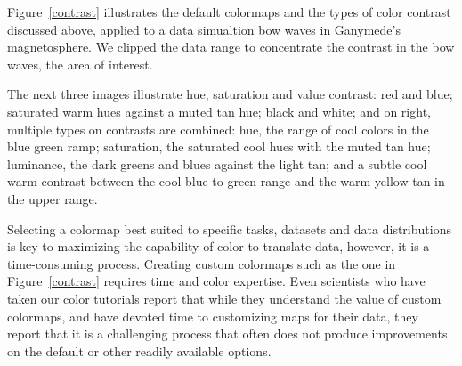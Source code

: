 \documentclass{IEEEcsmag}
\newcommand*{\colormap}[1]{\textsl{#1}\xspace}
\newcommand*{\huewheel}{\colormap{Hue Wheel}}
\newcommand*{\coolwarm}{\colormap{Cool to Warm}}
\newcommand*{\blueorange}{\colormap{Blue-Orange Diverging}}
\newcommand*{\fast}{\colormap{Fast}}
\begin{document}
Figure~\ref{contrast} illustrates the default colormaps and the types of color contrast discussed above, applied to a data simualtion bow waves in Ganymede's magnetosphere. We clipped the data range to concentrate the contrast in the bow waves, the area of interest. 


The next three images illustrate hue, saturation and value contrast: red and blue; saturated warm hues against a muted tan hue; black and white; and on right, multiple types on contrasts are combined: hue, the range of cool colors in the blue green ramp; saturation, the saturated cool hues with the muted tan hue; luminance, the dark greens and blues against the light tan; and a subtle cool warm contrast between the cool blue to green range and the warm yellow tan in the upper range.


Selecting a colormap best suited to specific tasks, datasets and data distributions is key to maximizing the capability of color to translate data, however, it is a time-consuming process. Creating custom colormaps such as the one in Figure~\ref{contrast} requires time and color expertise.  
Even scientists who have taken our color tutorials report that while they understand the value of custom colormaps, and have devoted time to customizing maps for their data, they report that it is a challenging process that often does not produce improvements on the default or other readily available options. 






\end{document}
